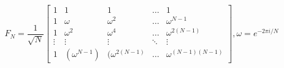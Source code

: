 \documentclass[]{article}
\begin{document}
\[ F_N = \frac{1}{\sqrt{N}} \begin{bmatrix} 1 & 1 & 1 & \ldots & 1 \\
	1 & \omega & \omega^2 & \ldots & \omega^{N-1} \\
	1 & \omega^2 & \omega^4 & \ldots & \omega^{2(N-1)} \\
	\vdots & \vdots & \vdots & \ddots & \vdots \\ 
	1 & (\omega^{N-1}) & (\omega^{2(N-1)} & \ldots & \omega^{(N-1)(N-1)} 
\end{bmatrix} 
,  \omega = e^{-2\pi i/N} 
\]
\end{document}
